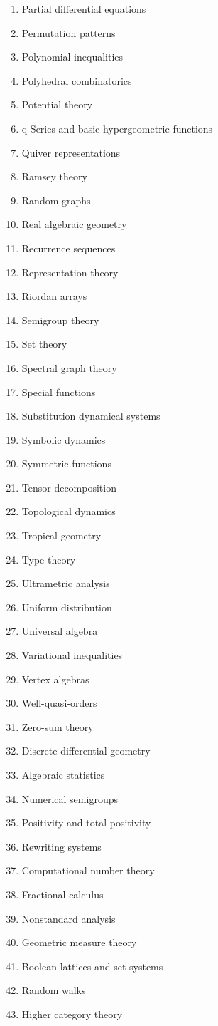 \begin{enumerate}[label=\arabic*.,itemsep=0pt,topsep=0pt,leftmargin=2.7em]
\item Partial differential equations
\item Permutation patterns
\item Polynomial inequalities
\item Polyhedral combinatorics
\item Potential theory
\item q-Series and basic hypergeometric functions
\item Quiver representations
\item Ramsey theory
\item Random graphs
\item Real algebraic geometry
\item Recurrence sequences
\item Representation theory
\item Riordan arrays
\item Semigroup theory
\item Set theory
\item Spectral graph theory
\item Special functions
\item Substitution dynamical systems
\item Symbolic dynamics
\item Symmetric functions
\item Tensor decomposition
\item Topological dynamics
\item Tropical geometry
\item Type theory
\item Ultrametric analysis
\item Uniform distribution
\item Universal algebra
\item Variational inequalities
\item Vertex algebras
\item Well-quasi-orders
\item Zero-sum theory
\item Discrete differential geometry
\item Algebraic statistics
\item Numerical semigroups
\item Positivity and total positivity
\item Rewriting systems
\item Computational number theory
\item Fractional calculus
\item Nonstandard analysis
\item Geometric measure theory
\item Boolean lattices and set systems
\item Random walks
\item Higher category theory
\end{enumerate}
